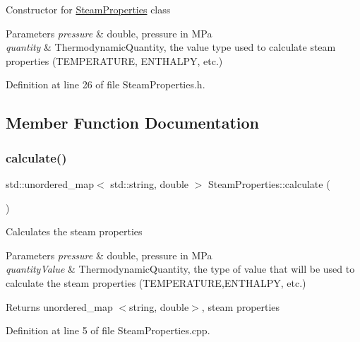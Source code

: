 Constructor for \hyperlink{class_steam_properties}{Steam\+Properties} class 
\begin{DoxyParams}{Parameters}
{\em pressure} & double, pressure in M\+Pa \\
\hline
{\em quantity} & Thermodynamic\+Quantity, the value type used to calculate steam properties (T\+E\+M\+P\+E\+R\+A\+T\+U\+RE, E\+N\+T\+H\+A\+L\+PY, etc.) \\
\hline
\end{DoxyParams}


Definition at line 26 of file Steam\+Properties.\+h.



\subsection{Member Function Documentation}
\mbox{\label{class_steam_properties_a449e2da87adb5a207bc73ec90f87922a}} 
\subsubsection{\texorpdfstring{calculate()}{calculate()}\hspace{0.1cm}{\footnotesize\ttfamily [1/3]}}
{\footnotesize\ttfamily std\+::unordered\+\_\+map$<$ std\+::string, double $>$ Steam\+Properties\+::calculate (\begin{DoxyParamCaption}{ }\end{DoxyParamCaption})}

Calculates the steam properties


\begin{DoxyParams}{Parameters}
{\em pressure} & double, pressure in M\+Pa \\
\hline
{\em quantity\+Value} & Thermodynamic\+Quantity, the type of value that will be used to calculate the steam properties (T\+E\+M\+P\+E\+R\+A\+T\+U\+RE,E\+N\+T\+H\+A\+L\+PY, etc.)\\
\hline
\end{DoxyParams}
\begin{DoxyReturn}{Returns}
unordered\+\_\+map $<$string, double$>$, steam properties 
\end{DoxyReturn}


Definition at line 5 of file Steam\+Properties.\+cpp.

\mbox{\label{class_steam_properties_a25dc635f2d8f24e0aa483ab86e5f10f0}} 
